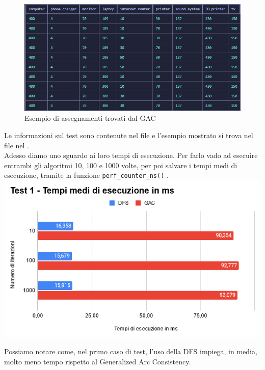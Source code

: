 \documentclass[12pt, letterpaper]{article}
\begin{document}
\begin{figure}[h]
      \centering
      \includegraphics[scale=0.65]{assegnamenti-gac.png}
      \caption{Esempio di assegnamenti trovati dal GAC}
\end{figure}


\break

\noindent Le informazioni sul test sono contenute nel file  e
l'esempio mostrato si trova nel file nel . \\

\noindent Adesso diamo uno sguardo ai loro tempi di esecuzione. Per farlo vado ad esecuire
entrambi gli algoritmi 10, 100 e 1000 volte, per poi salvare i tempi medi di esecuzione, tramite
la funzione \lstinline|perf_counter_ns()| \cite{perf_counter_ns_docs}. \\

\includegraphics[scale=0.8]{test-1-performance.png}

\noindent Possiamo notare come, nel primo caso di test, l'uso della DFS impiega, in media, molto meno
tempo rispetto al Generalized Arc Consistency. \\ \break
\end{document}
